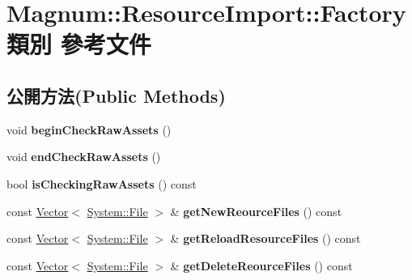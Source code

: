 \hypertarget{class_magnum_1_1_resource_import_1_1_factory}{}\section{Magnum\+:\+:Resource\+Import\+:\+:Factory 類別 參考文件}
\label{class_magnum_1_1_resource_import_1_1_factory}
\subsection*{公開方法(Public Methods)}
\begin{DoxyCompactItemize}
\item 
void {\bfseries begin\+Check\+Raw\+Assets} ()\hypertarget{class_magnum_1_1_resource_import_1_1_factory_a790a65c252d22c6a0e50748fe5cdfb7e}{}\label{class_magnum_1_1_resource_import_1_1_factory_a790a65c252d22c6a0e50748fe5cdfb7e}

\item 
void {\bfseries end\+Check\+Raw\+Assets} ()\hypertarget{class_magnum_1_1_resource_import_1_1_factory_a62073f5548016b6927db0cd7f13c6ef3}{}\label{class_magnum_1_1_resource_import_1_1_factory_a62073f5548016b6927db0cd7f13c6ef3}

\item 
bool {\bfseries is\+Checking\+Raw\+Assets} () const \hypertarget{class_magnum_1_1_resource_import_1_1_factory_a33de8d00843be2d5caaddd3b6d7edd30}{}\label{class_magnum_1_1_resource_import_1_1_factory_a33de8d00843be2d5caaddd3b6d7edd30}

\item 
const \hyperlink{class_magnum_1_1_vector}{Vector}$<$ \hyperlink{class_magnum_1_1_system_1_1_file}{System\+::\+File} $>$ \& {\bfseries get\+New\+Reource\+Files} () const \hypertarget{class_magnum_1_1_resource_import_1_1_factory_ad061aa5fa9b16d4a703b97d75e25da1f}{}\label{class_magnum_1_1_resource_import_1_1_factory_ad061aa5fa9b16d4a703b97d75e25da1f}

\item 
const \hyperlink{class_magnum_1_1_vector}{Vector}$<$ \hyperlink{class_magnum_1_1_system_1_1_file}{System\+::\+File} $>$ \& {\bfseries get\+Reload\+Resource\+Files} () const \hypertarget{class_magnum_1_1_resource_import_1_1_factory_ab7391983d40f7715346d84b23dc18eea}{}\label{class_magnum_1_1_resource_import_1_1_factory_ab7391983d40f7715346d84b23dc18eea}

\item 
const \hyperlink{class_magnum_1_1_vector}{Vector}$<$ \hyperlink{class_magnum_1_1_system_1_1_file}{System\+::\+File} $>$ \& {\bfseries get\+Delete\+Reource\+Files} () const \hypertarget{class_magnum_1_1_resource_import_1_1_factory_a91c27a5e353214f4f3020ccd1990b957}{}\label{class_magnum_1_1_resource_import_1_1_factory_a91c27a5e353214f4f3020ccd1990b957}


\end{DoxyCompactItemize}
